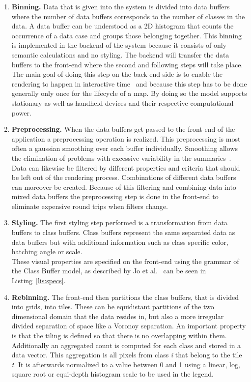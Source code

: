 \begin{enumerate}[leftmargin=*]
	\setlength\itemsep{0.1em}
	\item \textbf{Binning.} Data that is given into the system is divided into data buffers where the number of data buffers corresponds to the number of classes in the data. A data buffer can be understood as a 2D histogram that counts the occurrence of a data case and groups those belonging together. This binning is implemented in the backend of the system because it consists of only semantic calculations and no styling. The backend will transfer the data buffers to the front-end where the second and following steps will take place.\\The main goal of doing this step on the back-end side is to enable the rendering to happen in interactive time~\cite{jo2019declarative} and because this step has to be done generally only once for the lifecycle of a map. By doing so the model supports stationary as well as handheld devices and their respective computational power.
	\item \textbf{Preprocessing.} When the data buffers get passed to the front-end of the application a preprocessing operation is realized. This preprocessing is most often a gaussian smoothing over each buffer individually. Smoothing allows the elimination of problems with excessive variability in the summaries~\cite{wickham2013bin}.\\Data can likewise be filtered by different properties and criteria that should be left out of the rendering process. Combinations of different data buffers can moreover be created. Because of this filtering and combining data into mixed data buffers the preprocessing step is done in the front-end to eliminate expensive round trips when filters change.
	\item \textbf{Styling.} The first styling step performed is a transformation from data buffers to class buffers. Class buffers represent the same separated data as data buffers but with additional information such as class specific color, hatching angle or scale.\\These visual properties are specified on the front-end using the grammar of the Class Buffer model, as described by Jo et al.~\cite{jo2019declarative} can be seen in Listing~\ref{lis:specs}.
	\item \textbf{Rebinning.} The front-end then partitions the class buffers, that is divided into grids, into tiles. These can be equidistant partitions of the two dimensional domain that the data resides in, but also a more irregular divided separation of space like a Voronoy separation. An important property is that the tiling is defined so that there is no overlapping within them. Additionally an aggregated count is computed for each class and stored in a data vector. This aggregation is all pixels from class \textit{i} that belong to the tile \textit{t}. It is afterwards normalized to a value between 0 and 1 using a linear, log, square root or equi-depth histogram scale to be used in the legend.

\end{enumerate}
